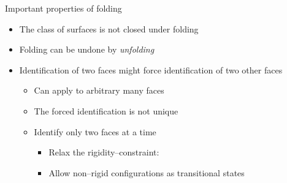 \newcommand{\colFaceA}{\colorFaceA}
\newcommand{\colFaceB}{\colorFaceB}
\newcommand{\colFaceC}{\colorFaceC}

\begin{frame}{Important properties of folding}
    \begin{itemize}
        \item<2-> The class of surfaces is not closed under folding
        \item<3-> Folding can be undone by \textit{unfolding}
        \item<4-> Identification of two faces might force identification of two other faces
            \begin{itemize}
                \item<7-> Can apply to arbitrary many faces 
                \item<10-> The forced identification is not unique
                \item<14-|handout:2>[$\Rightarrow$] Identify only two faces at a time
                    \begin{itemize}
                        \item<16-|handout:2>[$\leadsto$] Relax the rigidity--constraint:
                        \item<17-|handout:2> Allow non--rigid configurations as transitional states
                    \end{itemize}
            \end{itemize}
    \end{itemize}

    \begin{overlayarea}{\textwidth}{0.3\textwidth}
        \begin{center}


\end{center}
\end{overlayarea}
\end{frame}
